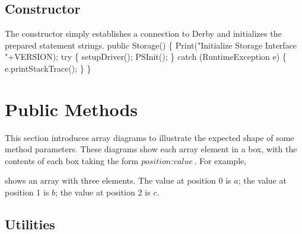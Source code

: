 \documentclass{article}
\def\nwendcode{\endtrivlist \endgroup}      %
\let\nwdocspar=\par
\theoremstyle{definition}                   %
\begin{document}
\subsection{Constructor}
\label{sec:constructor}
The constructor simply establishes a connection to Derby and initializes the
prepared statement strings.
\nwenddocs{}\endmoddef{}
public Storage() \{
  Print("Initialize Storage Interface "+VERSION);
  try \{
    setupDriver();
    PSInit();
  \} catch (RuntimeException e) \{
    e.printStackTrace();
  \}
\}
\nwendcode{}\nwdocspar

\section{Public Methods}
\label{sec:public-methods}
This section introduces array diagrams to illustrate the expected shape of some
method parameters. These diagrams show each array element in a box, with the contents
of each box taking the form $\textit{position}:\textit{value}$. For example,


\noindent shows an array with three elements. The value at position 0 is $a$; the
value at position 1 is $b$; the value at position 2 is $c$.

\subsection{Utilities}
\label{sec:utilities}
\end{document}
